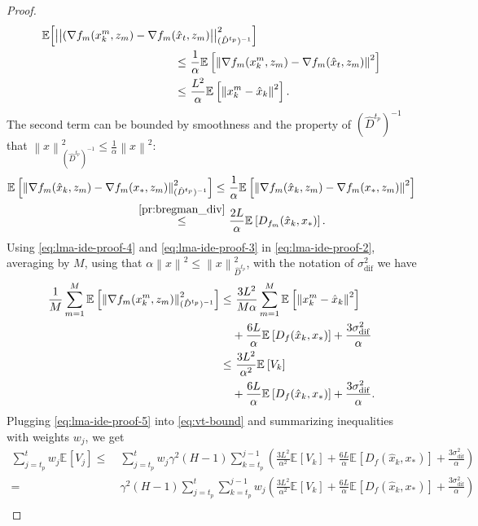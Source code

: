 \documentclass[sn-mathphys,Numbered]{sn-jnl}%
\renewcommand{\|}{\parallel}
\newcommand\ec[2][]{\ensuremath{\mathbb{E}_{#1} \left[#2\right]}}
\newcommand\ecn[3][]{\ec[#1]{\norm{#2}^2_{#3}}}
\newcommand\br[1]{\left ( #1 \right )}
\newcommand{\norm}[1]{\left\lVert#1\right\rVert}
\newcommand{\sqn}[1]{{\left\lVert#1\right\rVert}^2}
\newcommand{\avemm}{\frac{1}{M}\sum\limits_{m=1}^M}
\newcommand{\sigmaf}{\sigma_{\mathrm{dif}}}
\renewcommand {\*} {\ast}
\begin{document}
\begin{proof}
\begin{align}
        \mathbb{E}\Big[ \big{|} \big{|}(\nabla f_m(x_k^m, z_m) - \nabla f_m (\hat{x}_t&, z_m)\big{|} \big{|}^2_{(\hat{D}^{t_p})^{-1}}\Big] \nonumber \\ \leq&\ \frac{1}{\alpha}\ecn{\nabla f_m (x_k^m, z_m) - \nabla f_m (\hat{x}_t, z_m)} \nonumber \\  
        \leq&\ \frac{L^2}{\alpha} \ecn{x_k^m - \hat{x}_k}{}.
    \end{align}
    The second term can be bounded by smoothness and the property of $(\hat{D}^{t_p})^{-1}$ that $\sqn{x}_{(\hat{D}^{t_p})^{-1}} \leq \frac{1}{\alpha}\sqn{x}$:
    \begin{align}
        \label{eq:lma-ide-proof-4}
        \ecn{\nabla f_m (\hat{x}_k, z_m) - \nabla f_m (x_\ast, z_m)}{(\hat{D}^{t_p})^{-1}} \leq&\ \frac{1}{\alpha}\ecn{\nabla f_m (\hat{x}_k, z_m) - \nabla f_m (x_\ast, z_m)}{} \nonumber \\  
        \overset{\eqref{pr:bregman_div}}{\leq}&\ \frac{2L}{\alpha} \ec{D_{f_m} (\hat{x}_k, x_\ast)}.
    \end{align}
    Using \eqref{eq:lma-ide-proof-4} and \eqref{eq:lma-ide-proof-3} in \eqref{eq:lma-ide-proof-2}, averaging by $M$, using that $\alpha \sqn{x} \leq \sqn{x}_{\hat{D}^{t_p}}$, with the notation of $\sigmaf^2$ we have
    \begin{align}
        \label{eq:lma-ide-proof-5}
        \avemm \ecn{\nabla f_m(x_k^m, z_m)}{(\hat{D}^{t_p})^{-1}} \leq&\ \frac{3L^2}{M\alpha} \sum_{m=1}^{M} \ecn{x_k^m - \hat{x}_k} \nonumber\\ &+ \frac{6L}{\alpha} \ec{D_{f} (\hat{x}_k, x_\ast)} + \frac{3\sigmaf^2}{\alpha}  \nonumber \\
        \leq&\ \frac{3 L^2}{\alpha^2} \ec{V_k} \nonumber \\ &+ \frac{6 L}{\alpha} \ec{D_{f} (\hat{x}_k, x_\ast)} + \frac{3 \sigmaf^2}{\alpha}.
    \end{align}
   Plugging \eqref{eq:lma-ide-proof-5} into \eqref{eq:vt-bound} and summarizing inequalities with weights $w_j$, we get
   \begin{align}
       \label{eq:lma-ide-proof-6}
       \sum\limits_{j=t_p}^t w_j \ec{V_j} \leq&\ \sum\limits_{j=t_p}^t w_j \gamma^2(H-1) \sum\limits_{k=t_p}^{j - 1}\br{\frac{3 L^2}{\alpha^2} \ec{V_k} + \frac{6 L}{\alpha} \ec{D_{f} (\hat{x}_k, x_\ast)} + \frac{3 \sigmaf^2}{\alpha}} \nonumber \\
       =&\  \gamma^2(H-1) \sum\limits_{j=t_p}^t \sum\limits_{k=t_p}^{j - 1}w_j\br{\frac{3 L^2}{\alpha^2} \ec{V_k} + \frac{6 L}{\alpha} \ec{D_{f} (\hat{x}_k, x_\ast)} + \frac{3 \sigmaf^2}{\alpha}} \nonumber \\

\end{align}
\end{proof}
\end{document}
